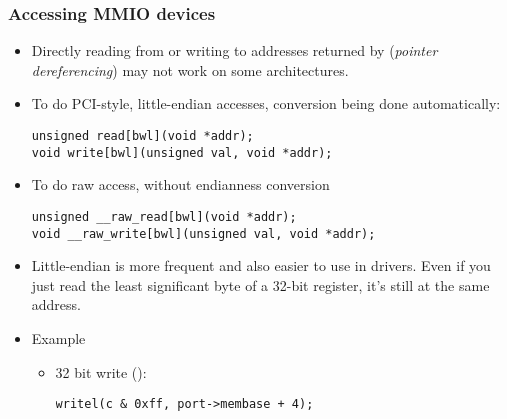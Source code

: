 \begin{frame}[fragile]
  \frametitle{Accessing MMIO devices}
  \begin{itemize}
  \item Directly reading from or writing to addresses returned by
     (\emph{pointer dereferencing}) may not work on some
    architectures.
  \item To do PCI-style, little-endian accesses, conversion being done
    automatically:
\begin{verbatim}
unsigned read[bwl](void *addr);
void write[bwl](unsigned val, void *addr);
\end{verbatim}
  \item To do raw access, without endianness conversion
\begin{verbatim}
unsigned __raw_read[bwl](void *addr);
void __raw_write[bwl](unsigned val, void *addr);
\end{verbatim}
  \item Little-endian is more frequent and also easier
        to use in drivers. Even if you just read the least significant
        byte of a 32-bit register, it's still at the same address.
  \item Example
    \begin{itemize}
    \item 32 bit write ():
\begin{verbatim}
writel(c & 0xff, port->membase + 4);
\end{verbatim}
    \end{itemize}
  \end{itemize}
\end{frame}

